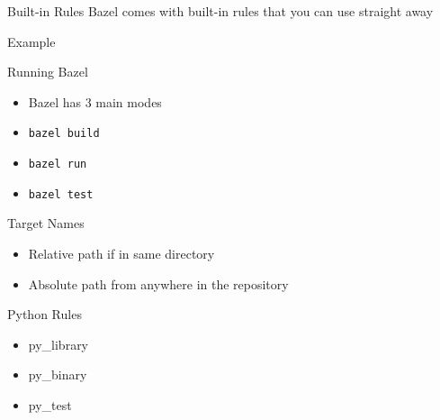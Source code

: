 \documentclass[aspectratio=169]{beamer}
\begin{document}
\begin{body-slide}{Built-in Rules}
Bazel comes with built-in rules that you can use straight away

\end{body-slide}

\begin{body-slide}{Example}

\end{body-slide}

\begin{body-slide}{Running Bazel}
\begin{itemize}[<+-| alert@+>]
    \color{UQCSBlue}
    \item Bazel has 3 main modes
    \item \texttt{bazel build}
    \item \texttt{bazel run}
    \item \texttt{bazel test}
\end{itemize}
\end{body-slide}

\begin{body-slide}{Target Names}
\begin{itemize}[<+-| alert@+>]
    \color{UQCSBlue}
    \item Relative path if in same directory
    \item Absolute path from anywhere in the repository
\end{itemize}
\end{body-slide}

\begin{body-slide}{Python Rules}
\begin{itemize}
    \item py\_library
    \item py\_binary
    \item py\_test
\end{itemize}
\end{body-slide}
\end{document}
